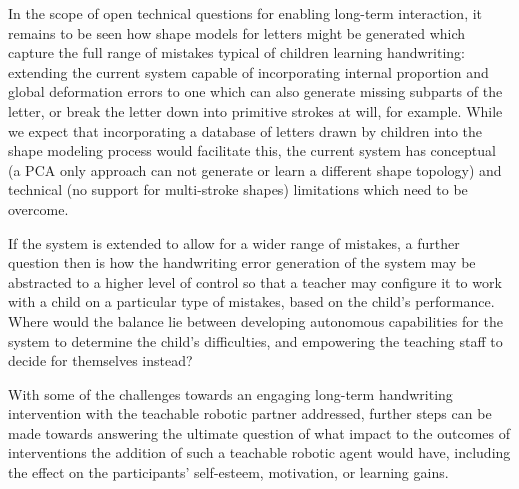 \documentclass{sig-alternate}
\begin{document}
In the scope of open technical questions for enabling long-term interaction, it remains to be seen how shape models
for letters might be generated which capture the full range of mistakes typical
of children learning handwriting: extending the current system capable of
incorporating internal proportion and global deformation errors to one which can
also generate missing subparts of the letter, or break the letter down into
primitive strokes at will, for example. While we expect that incorporating a
database of letters drawn by children into the shape modeling process would
facilitate this, the current system has conceptual (a PCA only approach can not
generate or learn a different shape topology) and technical (no support for
multi-stroke shapes) limitations which need to be overcome.

If the system is extended to allow for a wider range of mistakes, a further question 
then is how the handwriting error
generation of the system may be abstracted to a higher level of control so that
a teacher may configure it to work with a child on a particular type of
mistakes, based on the child's performance. Where would the balance lie between
developing autonomous capabilities for the system to determine the child's
difficulties, and empowering the teaching staff to decide for themselves
instead? 

With some of the challenges towards an engaging long-term handwriting intervention 
with the teachable robotic partner addressed, further steps can be made towards 
answering the ultimate question of what impact to the outcomes of interventions the 
addition of such a teachable robotic agent would have, including the effect on the 
participants' self-esteem, motivation, or learning gains. %



%

%
\end{document}
